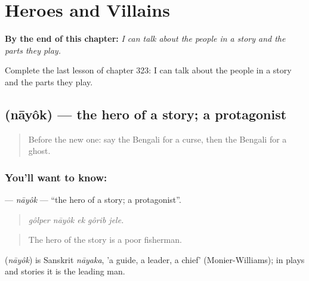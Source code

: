
\chapter{Heroes and Villains}
\label{ch:bn-heroes-and-villains}

\begin{chapteropening}
\textbf{By the end of this chapter:} \emph{I can talk about the people in a story and the parts they play.}

Complete the last lesson of chapter 323: I can talk about the people in a story and the parts they play.
\end{chapteropening}

\section[\texorpdfstring{\bn{নায়ক} (nāyôk)}{নায়ক (nāyôk)}]{ (nāyôk) — the hero of a story; a protagonist}

\label{lesson:BN-C323-nayok}



\begin{quote}
Before the new one: say the Bengali for a curse, then the Bengali for a ghost.
\end{quote}

\subsection*{You'll want to know: }
\textbf{} — \emph{nāyôk} — \textquotedblleft{}the hero of a story; a protagonist\textquotedblright{}.

\begin{quote}
    
\end{quote}

\begin{quote}
\emph{gôlper nāyôk ek gôrib jele.}
\end{quote}

\begin{quote}
The hero of the story is a poor fisherman.
\end{quote}

\begin{cousinweb}
\textbf{} (\emph{nāyôk}) is Sanskrit \emph{nāyaka}, 'a guide, a leader, a chief' (Monier-Williams); in plays and stories it is the leading man.
\end{cousinweb}

